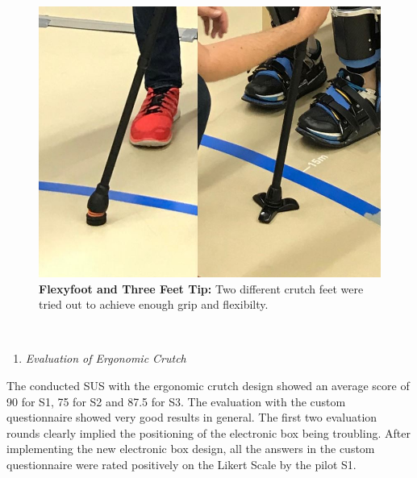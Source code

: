 \documentclass[conference,a4paper]{IEEEtran}
\begin{document}
\begin{figure}
    \centering
    \includegraphics[width=1\columnwidth]{Images/Results/feet.JPG}
    \caption{\textbf{Flexyfoot and Three Feet Tip:} Two different crutch feet were tried out to achieve enough grip and flexibilty.}
    \label{fig:LAM}
\end{figure} \\



\begin{enumerate}[\textit{(5)}]
    \item{\textit{Evaluation of Ergonomic Crutch}}
\end{enumerate}
The conducted SUS with the ergonomic crutch design showed an average score of 90 for S1, 75 for S2 and 87.5 for S3. The evaluation with the custom questionnaire showed very good results in general. The first two evaluation rounds clearly implied the positioning of the electronic box being troubling. After implementing the new electronic box design, all the answers in the custom questionnaire were rated positively on the Likert Scale by the pilot S1.\\
\end{document}
